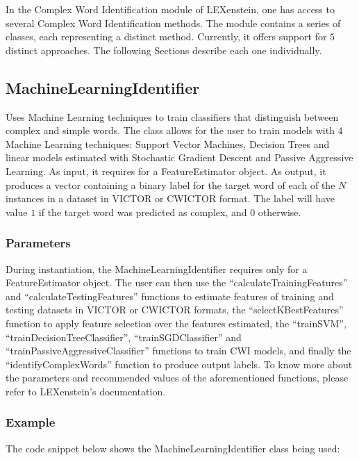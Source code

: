 In the Complex Word Identification module of LEXenstein, one has access to several Complex Word Identification methods. The module contains a series of classes, each representing a distinct method. Currently, it offers support for $5$ distinct approaches. The following Sections describe each one individually.

\subsection{MachineLearningIdentifier}

Uses Machine Learning techniques to train classifiers that distinguish between complex and simple words. The class allows for the user to train models with $4$ Machine Learning techniques: Support Vector Machines, Decision Trees and linear models estimated with Stochastic Gradient Descent and Passive Aggressive Learning. As input, it requires for a FeatureEstimator object. As output, it produces a vector containing a binary label for the target word of each of the $N$ instances in a dataset in VICTOR or CWICTOR format. The label will have value $1$ if the target word was predicted as complex, and $0$ otherwise.

\subsubsection{Parameters}

During instantiation, the MachineLearningIdentifier requires only for a FeatureEstimator object. The user can then use the ``calculateTrainingFeatures'' and ``calculateTestingFeatures'' functions to estimate features of training and testing datasets in VICTOR or CWICTOR formats, the ``selectKBestFeatures'' function to apply feature selection over the features estimated, the ``trainSVM'', ``trainDecisionTreeClassifier'', ``trainSGDClassifier'' and ``trainPassiveAggressiveClassifier'' functions to train CWI models, and finally the ``identifyComplexWords'' function to produce output labels. To know more about the parameters and recommended values of the aforementioned functions, please refer to LEXenstein's documentation.

\subsubsection{Example}

The code snippet below shows the MachineLearningIdentifier class being used:

